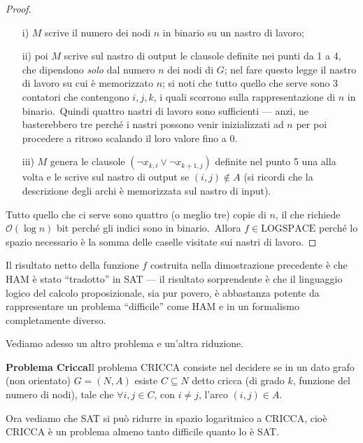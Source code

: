\begin{proof}
    \begin{itemize}
        \item[i)] $M$ scrive il numero dei nodi $n$ in binario su un nastro di lavoro;
        \item[ii)] poi $M$ scrive sul nastro di output le clausole definite nei punti da 1 a 4, che dipendono \textit{solo} dal numero $n$ dei nodi di $G$; nel fare questo legge il nastro di lavoro su cui è memorizzato $n$; si noti che tutto quello che serve sono 3 contatori che contengono $i,j,k$, i quali scorrono sulla rappresentazione di $n$ in binario.\ Quindi quattro nastri di lavoro sono sufficienti --- anzi, ne basterebbero tre perché i nastri possono venir inizializzati ad $n$ per poi procedere a ritroso scalando il loro valore fino a 0.
        \item[iii)] $M$ genera le clausole $(\neg x_{k,i} \lor \neg x_{k+1,j})$ definite nel punto 5 una alla volta e le scrive sul nastro di output se $(i,j) \notin A$ (si ricordi che la descrizione degli archi è memorizzata sul nastro di input).
    \end{itemize}
    Tutto quello che ci serve sono quattro (o meglio tre) copie di $n$, il che richiede $\mathcal{O}(\log n)$ bit perché gli indici sono in binario.\
    Allora $f \in \mathrm{LOGSPACE}$ perché lo spazio necessario è la somma delle caselle visitate sui nastri di lavoro.

\end{proof}

\noindent Il risultato netto della funzione $f$ costruita nella dimostrazione precedente è che {\footnotesize HAM} è stato ``tradotto'' in {\footnotesize SAT} --- il risultato sorprendente è che il linguaggio logico del calcolo proposizionale, sia pur povero, è abbastanza potente da rappresentare un problema ``difficile'' come {\footnotesize HAM} e in un formalismo completamente diverso.

Vediamo adesso un altro problema e un'altra riduzione.

\vspace{12pt}
\noindent \textbf{Problema Cricca}\quad Il problema {\footnotesize CRICCA} consiste nel decidere se in un dato grafo (non orientato) $G = (N,A)$ esiste $C \subseteq N$ detto cricca (di grado $k$, funzione del numero di nodi), tale che $\forall i,j \in C$, con $i \neq j$, l'arco $(i,j) \in A$.\

\medskip
\noindent Ora vediamo che {\footnotesize SAT} si può ridurre in spazio logaritmico a {\footnotesize CRICCA}, cioè {\footnotesize CRICCA} è un problema almeno tanto difficile quanto lo è {\footnotesize SAT}.\

